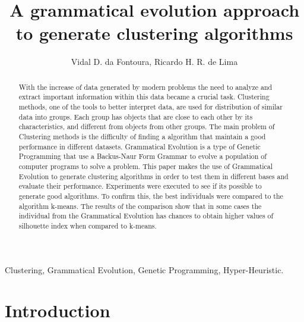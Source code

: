\documentclass[journal]{IEEEtran}
\begin{document}
%

\title{A grammatical evolution approach to generate clustering algorithms}


\author{
	Vidal D. da Fontoura,
	Ricardo H. R. de Lima
	}


\maketitle

\begin{abstract}
With the increase of data generated by modern problems  the need to analyze and extract important information within this data became a crucial task. Clustering methods, one of the tools to better interpret data, are used for distribution of similar data into groups. Each group has objects that are close to each other by its characteristics, and different from objects from other groups. The main problem of Clustering methods is the difficulty of finding a algorithm that maintain a good performance in different datasets. Grammatical Evolution is a type of Genetic Programming that use a Backus-Naur Form Grammar to evolve a population of computer programs to solve a problem. This paper makes the use of Grammatical Evolution to generate clustering algorithms in order to test them in different bases and evaluate their performance. Experiments were executed to see if its possible to generate good algorithms. To confirm this, the best individuals were compared to the algorithm k-means. The results of the comparison show that in some cases the individual from the Grammatical Evolution has chances to obtain higher values of silhouette index when compared to k-means.

\end{abstract}

\begin{IEEEkeywords}
	Clustering, Grammatical Evolution, Genetic Programming, Hyper-Heuristic.
\end{IEEEkeywords}

\IEEEpeerreviewmaketitle

\section{Introduction}
\end{document}
